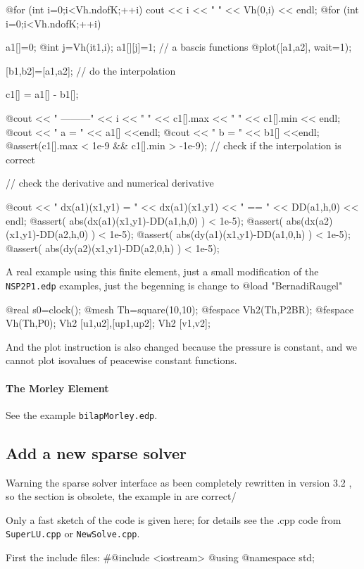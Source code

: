 \documentclass[a4paper,twoside,12pt]{book}
\begin{document}
@for (int i=0;i<Vh.ndofK;++i)
	cout << i << " " << Vh(0,i) << endl;
@for (int i=0;i<Vh.ndofK;++i)
{
  a1[]=0;	
  @int j=Vh(it1,i);
  a1[][j]=1; // a bascis functions
  @plot([a1,a2], wait=1);

  [b1,b2]=[a1,a2]; // do the interpolation

  c1[] = a1[] - b1[];

  @cout << " ---------" << i << " " << c1[].max << " " << c1[].min << endl;	
  @cout << " a = " << a1[] <<endl;
  @cout << " b = " << b1[] <<endl;
  @assert(c1[].max < 1e-9 && c1[].min > -1e-9); // check if the interpolation is correct

 //  check the derivative and numerical derivative

  @cout << " dx(a1)(x1,y1) = " << dx(a1)(x1,y1) << " == " << DD(a1,h,0) << endl;
  @assert( abs(dx(a1)(x1,y1)-DD(a1,h,0) ) < 1e-5);
  @assert( abs(dx(a2)(x1,y1)-DD(a2,h,0) ) < 1e-5);
  @assert( abs(dy(a1)(x1,y1)-DD(a1,0,h) ) < 1e-5);
  @assert( abs(dy(a2)(x1,y1)-DD(a2,0,h) ) < 1e-5);

}
 \eFF

 A real example using this finite element, just a small modification
 of the \texttt{NSP2P1.edp} examples, just the begenning is change to
\bFF
@load "BernadiRaugel"

@real s0=clock();
@mesh Th=square(10,10);
@fespace Vh2(Th,P2BR);
@fespace Vh(Th,P0);
Vh2 [u1,u2],[up1,up2];
Vh2 [v1,v2];
\eFF

And the plot instruction is also changed  because the pressure is constant, and  we cannot  plot isovalues of peacewise constant functions.

\paragraph{The Morley Element}
See the example \texttt{bilapMorley.edp}.

\subsection{Add a new sparse solver}
Warning the sparse solver interface as been completely rewritten in version 3.2 ,
so the section is obsolete, the example in are correct/

Only a fast sketch of the code is given here; for details see the .cpp code
from \texttt{SuperLU.cpp} or \texttt{NewSolve.cpp}.

First the include files:
\bFF
#@include  <iostream>
@using @namespace std;
\end{document}
